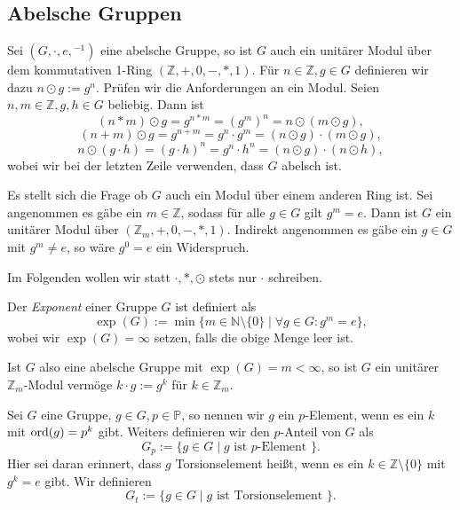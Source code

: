 
\subsection{Abelsche Gruppen}

\begin{remark}
    Sei $(G, \cdot, e, {}^{-1})$ eine abelsche Gruppe, so ist $G$ auch ein unitärer Modul über dem kommutativen 1-Ring $(\mathbb{Z}, +, 0, -, \ast, 1)$. Für $n \in \mathbb{Z}, g \in G$ definieren wir dazu $n \odot g := g^n$. Prüfen wir die Anforderungen an ein Modul. Seien $n, m \in \mathbb{Z}, g, h \in G$ beliebig. Dann ist
    $$ (n \ast m) \odot g = g^{n \ast m} = (g^m)^n = n \odot (m \odot g), $$
    $$ (n+m) \odot g = g^{n+m} = g^n \cdot g^m = (n \odot g) \cdot (m \odot g), $$
    $$ n \odot (g \cdot h) = (g \cdot h)^n = g^n \cdot h^n = (n \odot g) \cdot (n \odot h), $$
    wobei wir bei der letzten Zeile verwenden, dass $G$ abelsch ist.

    Es stellt sich die Frage ob $G$ auch ein Modul über einem anderen Ring ist. Sei angenommen es gäbe ein $m \in \mathbb{Z}$, sodass für alle $g \in G$ gilt $g^m = e$. Dann ist $G$ ein unitärer Modul über $(\mathbb{Z}_m, +, 0, -, \ast, 1)$. Indirekt angenommen es gäbe ein $g \in G$ mit $g^m \neq e$, so wäre $g^0 = e$ ein Widerspruch.

    Im Folgenden wollen wir statt $\cdot, \ast, \odot$ stets nur $\cdot$ schreiben.
\end{remark}

\begin{definition}
    Der \emph{Exponent} einer Gruppe $G$ ist definiert als
    $$ \exp(G) := \min \{ m \in \mathbb{N} \setminus \{0\} \mid \forall g \in G: g^m = e \}, $$
    wobei wir $\exp(G) = \infty$ setzen, falls die obige Menge leer ist.
\end{definition}

\begin{remark}
    Ist $G$ also eine abelsche Gruppe mit $\exp(G) = m < \infty$, so ist $G$ ein unitärer $\mathbb{Z}_m$-Modul vermöge $k \cdot g := g^k$ für $k \in \mathbb{Z}_m$.
\end{remark}

\begin{definition}
    Sei $G$ eine Gruppe, $g \in G, p \in \mathbb{P}$, so nennen wir $g$ ein $p$-Element, wenn es ein $k$ mit $\operatorname{ord}(g) = p^k$ gibt. Weiters definieren wir den $p$-Anteil von $G$ als
    $$ G_p := \{ g \in G \mid g \textrm{ ist $p$-Element } \}. $$
    Hier sei daran erinnert, dass $g$ Torsionselement heißt, wenn es ein $k \in \mathbb{Z} \setminus \{ 0 \}$ mit $g^k = e$ gibt. Wir definieren
    $$ G_t := \{ g \in G \mid g \textrm{ ist Torsionselement } \}. $$
\end{definition}

